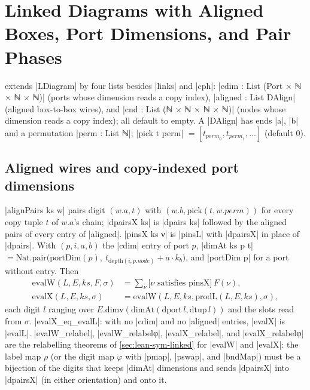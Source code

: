 \section{Linked Diagrams with Aligned Boxes, Port Dimensions, and Pair Phases}\label{sec:lean-sym-linked-ext}

 extends \lean|LDiagram| by four lists besides \lean|links| and \lean|cph|: \lean|cdim : List (Port × ℕ × ℕ × ℕ)| (ports whose dimension reads a copy index), \lean|aligned : List DAlign| (aligned box-to-box wires), and \lean|cnd : List (ℕ × ℕ × ℕ × ℕ)| (nodes whose dimension reads a copy index); all default to empty. A \lean|DAlign| has ends \lean|a|, \lean|b| and a permutation \lean|perm : List ℕ|; \lean|pick t perm| $=[t_{\mathit{perm}_0},t_{\mathit{perm}_1},\ldots]$ (default $0$).

\subsection{Aligned wires and copy-indexed port dimensions}

\begin{definition}\label{def:lean-sym-evalX}
\lean|alignPairs ks w| pairs digit $(w.a,t)$ with $(w.b,\mathrm{pick}(t,w.\mathit{perm}))$ for every copy tuple $t$ of $w.a$'s chain; \lean|dpairsX ks| is \lean|dpairs ks| followed by the aligned pairs of every entry of \lean|aligned|. \lean|pinsX ks ν| is \lean|pinsL| with \lean|dpairsX| in place of \lean|dpairs|. With $(p,i,a,b)$ the \lean|cdim| entry of port $p$, \lean|dimAt ks p t| $=\mathrm{Nat.pair}\bigl(\mathrm{portDim}(p),\ t_{\mathrm{depth}(i,p.\mathit{node})}+a\cdot k_b\bigr)$, and \lean|portDim p| for a port without entry. Then
\begin{align*}
\mathrm{evalW}(L,E,ks,F,\sigma)&=\sum_{\nu}\bigl[\nu\text{ satisfies }\mathrm{pinsX}\bigr]\,F(\nu),\\
\mathrm{evalX}(L,E,ks,\sigma)&=\mathrm{evalW}(L,E,ks,\mathrm{prodL}(L,E,ks),\sigma),
\end{align*}
each digit $l$ ranging over $E.\mathrm{dimv}(\mathrm{dimAt}(\mathrm{dport}\,l,\mathrm{dtup}\,l))$ and the slots read from $\sigma$.
\lean|evalX_eq_evalL|: with no \lean|cdim| and no \lean|aligned| entries, \lean|evalX| is \lean|evalL|. \lean|evalW_relabel|, \lean|evalW_relabelφ|, \lean|evalX_relabel|, and \lean|evalX_relabelφ| are the relabelling theorems of \cref{sec:lean-sym-linked} for \lean|evalW| and \lean|evalX|: the label map $\rho$ (or the digit map $\varphi$ with \lean|pmap|, \lean|pswap|, and \lean|bndMap|) must be a bijection of the digits that keeps \lean|dimAt| dimensions and sends \lean|dpairsX| into \lean|dpairsX| (in either orientation) and onto it.
\end{definition}

